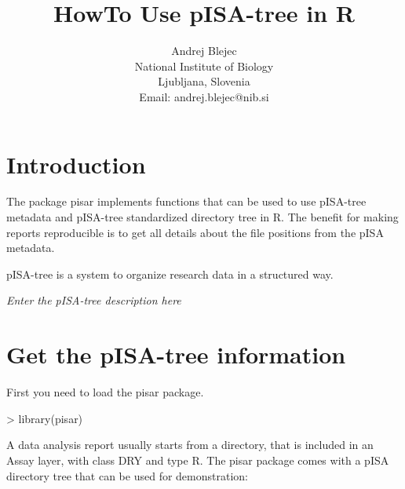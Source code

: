 \documentclass[a4paper,12pt]{article}\usepackage[]{graphicx}\usepackage[]{color}
\makeatletter
\providecommand\code{\bgroup\@codex}
\def\@codex#1{{\normalfont\ttfamily\hyphenchar\font=-1  #1}\egroup}
\providecommand{\strong}[1]{{\normalfont\fontseries{b}\selectfont  #1}}
\let\pkg=\strong
\makeatother
\begin{document}
\title{HowTo Use pISA-tree in R}
\author{Andrej Blejec\\
National Institute of Biology\\
Ljubljana, Slovenia\\
\small{Email: \code{andrej.blejec@nib.si}}
}%
%

\maketitle
\tableofcontents



\section{Introduction}
The package \pkg{pisar} implements functions that can be used to
use pISA-tree metadata and pISA-tree standardized directory tree in R.
The benefit for making reports reproducible is to get all details about the
file positions from the pISA metadata.

pISA-tree is a system to organize research data in a structured way.

\emph{Enter the pISA-tree description here}

\section{Get the pISA-tree information}

First you need to load the \pkg{pisar} package.

\begin{Schunk}
\begin{Sinput}
> library(pisar)
\end{Sinput}
\end{Schunk}

A data analysis report usually starts from a directory, that is
included in an Assay layer, with class \code{DRY} and type \code{R}.
The \pkg{pisar} package comes with a pISA directory tree that can be
used for demonstration:
\end{document}
